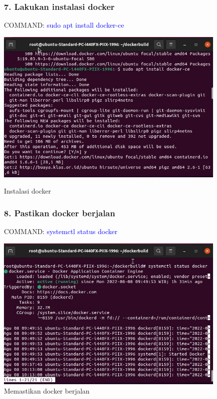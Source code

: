 \begin{figure}
\subsubsection{7. Lakukan instalasi docker}
COMMAND: \textcolor{Blue}{sudo apt install docker-ce}
        \begin{center}
          \includegraphics[width=\linewidth]{image/17.jpg}
          \caption{Instalasi docker}
          \label{fig:my_figure}
        \end{center}

\subsubsection{8. Pastikan docker berjalan}
COMMAND: \textcolor{Blue}{systemctl status docker}
        \begin{center}
          \includegraphics[width=\linewidth]{image/14.jpg}
          \caption{Memastikan docker berjalan}
          \label{fig:my_figure}
        \end{center}
\end{figure}